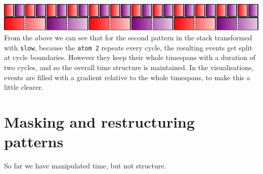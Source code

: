 \begin{Shaded}
\begin{Highlighting}[]
\OtherTok{=}\NormalTok{ stack [fast (atom }
\NormalTok{             ]}
    \OtherTok{=}\NormalTok{ interlace [atom }\NormalTok{]}
\end{Highlighting}
\end{Shaded}

\includegraphics{../figures/fig5.pdf}\\

From the above we can see that for the second pattern in the stack
transformed with \texttt{slow}, because the \texttt{atom\ 2} repeats
every cycle, the resulting events get split at cycle boundaries. However
they keep their whole timespans with a duration of two cycles, and so
the overall time structure is maintained. In the visualisations, events
are filled with a gradient relative to the whole timespans, to make this
a little clearer.

\section{Masking and restructuring
patterns}\label{masking-and-restructuring-patterns}

So far we have manipulated time, but not structure.

